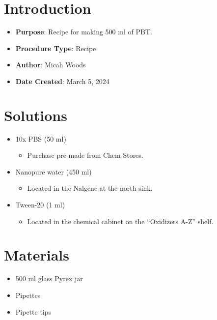 \documentclass[
  letterpaper,
  DIV=11,
  numbers=noendperiod]{scrreprt}
\providecommand{\tightlist}{%
  \setlength{\itemsep}{0pt}\setlength{\parskip}{0pt}}\usepackage{longtable,booktabs,array}
\begin{document}
\hypertarget{introduction-108}{%
\section{Introduction}\label{introduction-108}}

\begin{itemize}
\tightlist
\item
  \textbf{Purpose}: Recipe for making 500 ml of PBT.
\item
  \textbf{Procedure Type}: Recipe
\item
  \textbf{Author}: Micah Woods
\item
  \textbf{Date Created}: March 5, 2024
\end{itemize}

\hypertarget{solutions-94}{%
\section{Solutions}\label{solutions-94}}

\begin{itemize}
\tightlist
\item
  10x PBS (50 ml)

  \begin{itemize}
  \tightlist
  \item
    Purchase pre-made from Chem Stores.
  \end{itemize}
\item
  Nanopure water (450 ml)

  \begin{itemize}
  \tightlist
  \item
    Located in the Nalgene at the north sink.
  \end{itemize}
\item
  Tween-20 (1 ml)

  \begin{itemize}
  \tightlist
  \item
    Located in the chemical cabinet on the ``Oxidizers A-Z'' shelf.
  \end{itemize}
\end{itemize}

\hypertarget{materials-103}{%
\section{Materials}\label{materials-103}}

\begin{itemize}
\tightlist
\item
  500 ml glass Pyrex jar
\item
  Pipettes
\item
  Pipette tips
\end{itemize}
\end{document}
